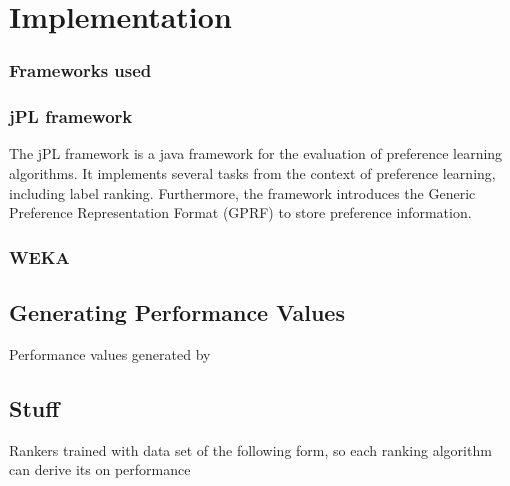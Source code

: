 %
\chapter{Implementation}
\label{sec:implementation}

\subsection{Frameworks used}


\subsection{jPL framework}
The jPL framework is a java framework for the evaluation of preference learning algorithms. It implements several tasks from the context of preference learning, including label ranking. Furthermore, the framework introduces the Generic Preference Representation Format (GPRF) to store preference information.

\subsection{WEKA}


\section{Generating Performance Values}
Performance values generated by 

\section{Stuff}

Rankers trained with data set of the following form, so each ranking algorithm can derive its on performance


